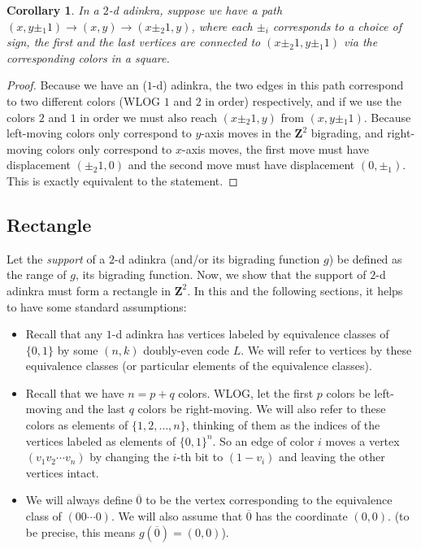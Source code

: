 \documentclass[12pt,twoside,singlespace]{article}
\numberwithin{equation}{section}
\newtheorem{cor}[equation]{Corollary}
\theoremstyle{definition}
\newcommand{\ZZ}{\mathbf{Z}}
\begin{document}
\begin{cor}
\label{cor:square}
In a $2$-d adinkra, suppose we have a path $(x, y \pm_1 1) \rightarrow (x, y) \rightarrow (x \pm_2 1, y)$, where each $\pm_i$ corresponds to a choice of sign, the first and the last vertices are connected to $(x \pm_2 1, y \pm_1 1)$ via the corresponding colors in a square.
\end{cor}
\begin{proof}
Because we have an ($1$-d) adinkra, the two edges in this path correspond to two different colors (WLOG $1$ and $2$ in order) respectively, and if we use the colors $2$ and $1$ in order we must also reach $(x \pm_2 1, y)$ from $(x, y \pm_1 1)$. Because left-moving colors only correspond to $y$-axis moves in the $\ZZ^2$ bigrading, and right-moving colors only correspond to $x$-axis moves, the first move must have displacement $(\pm_2 1, 0)$ and the second move must have displacement $(0, \pm_1)$. This is exactly equivalent to the statement.
\end{proof}

\subsection{Rectangle}

Let the \emph{support} of a $2$-d adinkra (and/or its bigrading function $g$) be defined as the range of $g$, its bigrading function. Now, we show that the support of $2$-d adinkra must form a rectangle in $\ZZ^2$. In this and the following sections, it helps to have some standard assumptions:

\begin{itemize}
\item Recall that any $1$-d adinkra has vertices labeled by equivalence classes of $\{0,1\}$ by some $(n,k)$ doubly-even code $L$. We will refer to vertices by these equivalence classes (or particular elements of the equivalence classes). 
\item Recall that we have $n = p+q$ colors. WLOG, let the first $p$ colors be left-moving and the last $q$ colors be right-moving. We will also refer to these colors as elements of $\{1, 2, \ldots, n\}$, thinking of them as the indices of the vertices labeled as elements of $\{0, 1\}^n$. So an edge of color $i$ moves a vertex $(v_1 v_2 \cdots v_n)$ by changing the $i$-th bit to $(1 - v_i)$ and leaving the other vertices intact. 
\item We will always define $\overline{0}$ to be the vertex corresponding to the equivalence class of $(00\cdots0)$. We will also assume that $\overline{0}$ has the coordinate $(0,0)$. (to be precise, this means $g(\overline{0}) = (0,0)$).
\end{itemize}
\end{document}
